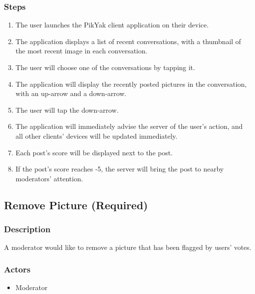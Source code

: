 \documentclass[11pt]{scrartcl}
\begin{document}
        \subsubsection{Steps}
            \begin{enumerate}
                \item The user launches the PikYak client application on their device.
                \item The application displays a list of recent conversations, with a thumbnail of the most recent image in each conversation.
                \item The user will choose one of the conversations by tapping it.
                \item The application will display the recently posted pictures in the conversation, with an up-arrow and a down-arrow.
                \item The user will tap the down-arrow.
                \item The application will immediately advise the server of the user's action, and all other clients' devices will be updated immediately.
                \item Each post's score will be displayed next to the post.
                \item If the post's score reaches -5, the server will bring the post to nearby moderators' attention.
            \end{enumerate}

    \subsection{Remove Picture (Required)}
    \label{sec:remove}
        \subsubsection{Description}
            A moderator would like to remove a picture that has been flagged by users' votes.
        \subsubsection{Actors}
            \begin{itemize}
                \item Moderator
            \end{itemize}
\end{document}
